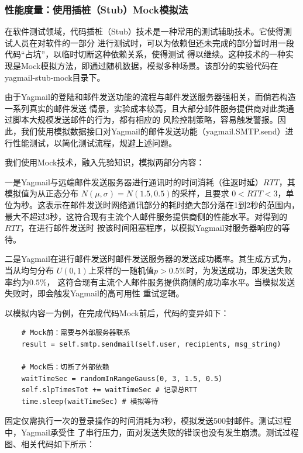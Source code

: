 \documentclass[UTF8,12pt,a4paper]{ctexart}
\begin{document}
    \subsubsection{性能度量：使用插桩（Stub）Mock模拟法}

    在软件测试领域，代码插桩（Stub）技术是一种常用的测试辅助技术。它使得测试人员在对软件的一部分
    进行测试时，可以为依赖但还未完成的部分暂时用一段代码“占坑”，以临时切断这种依赖关系，使得测试
    得以继续。这种技术的一种实现是Mock模拟方法，即通过随机数据，模拟多种场景。该部分的实验代码在
    yagmail-stub-mock目录下。
    
    由于Yagmail的登陆和邮件发送功能的流程与邮件发送服务器强相关，而倘若构造一系列真实的邮件发送
    情景，实验成本较高，且大部分邮件服务提供商对此类通过脚本大规模发送邮件的行为，都有相应的
    风险控制策略，容易触发警报。因此，我们使用模拟数据接口对Yagmail的邮件发送功能（yagmail.SMTP.send）进行性能测试，以简化测试流程，规避上述问题。
    
    我们使用Mock技术，融入先验知识，模拟两部分内容：
    
    一是Yagmail与远端邮件发送服务器进行通讯时的时间消耗（往返时延）$RTT$，其模拟值为从正态分布
    $N(\mu, \sigma) = N(1.5, 0.5)$的采样，且要求
    $0 < RTT < 3$，单位为秒。这表示在邮件发送时网络通讯部分的耗时绝大部分落在1到2秒的范围内，
    最大不超过3秒，这符合现有主流个人邮件服务提供商侧的性能水平。对得到的$RTT$，在进行邮件发送时
    按该时间阻塞程序，以模拟Yagmail对服务器响应的等待。
    
    二是Yagmail在进行邮件发送时邮件发送服务器的发送成功概率。其生成方式为，当从均匀分布
    $U(0, 1)$上采样的一随机值$p > 0.5\%$时，为发送成功，即发送失败率约为$0.5\%$，
    这符合现有主流个人邮件服务提供商侧的成功率水平。当模拟发送失败时，即会触发Yagmail的高可用性
    重试逻辑。
    
    以模拟内容一为例，在完成代码Mock前后，代码的变异如下：
    
    \begin{lstlisting}
    # Mock前：需要与外部服务器联系
    result = self.smtp.sendmail(self.user, recipients, msg_string)
    
    # Mock后：切断了外部依赖
    waitTimeSec = randomInRangeGauss(0, 3, 1.5, 0.5)
    self.slpTimesTot += waitTimeSec # 记录总RTT
    time.sleep(waitTimeSec) # 模拟等待
    \end{lstlisting}
    
    固定仅需执行一次的登录操作的时间消耗为3秒，模拟发送500封邮件。测试过程中，Yagmail承受住
    了串行压力，面对发送失败的错误也没有发生崩溃。测试过程图、相关代码如下所示：
    
\end{document}
